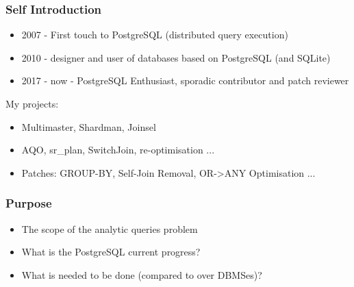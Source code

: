 \documentclass{beamer}
\begin{document}

\begin{frame}[fragile]\frametitle{Self Introduction}
\begin{itemize}
  \item 2007 - First touch to PostgreSQL (distributed query execution)
  \item 2010 - designer and user of databases based on PostgreSQL (and SQLite)
  \item 2017 - now - PostgreSQL Enthusiast, sporadic contributor and patch reviewer
\end{itemize}
My projects:
\begin{itemize}
  \item Multimaster, Shardman, Joinsel
  \item AQO, sr\_plan, SwitchJoin, re-optimisation ...
  \item Patches: GROUP-BY, Self-Join Removal, OR->ANY Optimisation ...
\end{itemize}
\end{frame}

\begin{frame}\frametitle{Purpose}
\begin{itemize}
  \item The scope of the analytic queries problem
  \item What is the PostgreSQL current progress?
  \item What is needed to be done (compared to over DBMSes)?
\end{itemize}
\end{frame}
\end{document}
